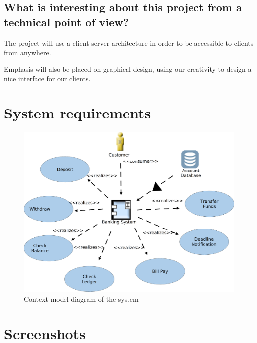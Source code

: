 \documentclass[
10pt, %
letterpaper, %
oneside, %
headinclude,footinclude, %
BCOR5mm, %
]{scrartcl}
\begin{document}
\subsection{What is interesting about this project from a technical
point of
view?}

The project will use a client-server architecture in order to be
accessible to clients from anywhere.

Emphasis will also be placed on graphical design, using our creativity
to design a nice interface for our clients.

\section{System requirements}

\begin{figure}[H]
  \centering
    \includegraphics[width=\textwidth]{context_model.png}
  \caption{Context model diagram of the system}
\end{figure}

\appendix

\section{Screenshots}
\end{document}

